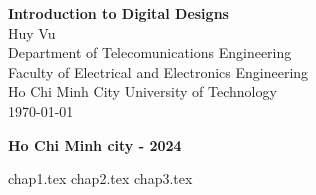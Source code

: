 \documentclass[12pt, a4paper]{article}
\begin{document}
\begin{titlepage}
    \centering
    \vspace*{1in}

    {\LARGE \bfseries Introduction to Digital Designs}\\[1.5cm]

    {\large Huy Vu}\\[0.5cm]
    {\large Department of Telecomunications Engineering}\\
    {\large Faculty of Electrical and Electronics Engineering}\\
    {\large Ho Chi Minh City University of Technology}\\[2cm]

    {\large \today}

    \vfill
    {\bfseries Ho Chi Minh city - 2024}
\end{titlepage}
{
  \tableofcontents
}
\newpage
{chap1.tex}
\newpage
{chap2.tex}
\newpage
{chap3.tex}
\end{document}
